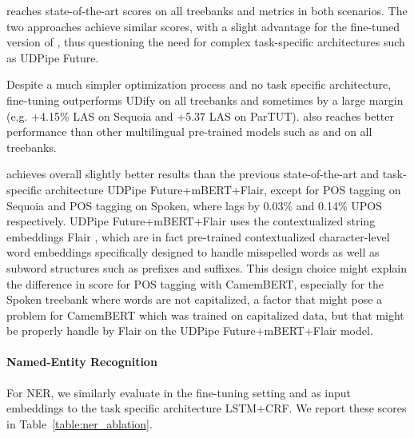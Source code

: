 \camembert reaches state-of-the-art scores on all treebanks and metrics in both scenarios. The two approaches achieve similar scores, with a slight advantage for the fine-tuned version of \camembert, thus questioning the need for complex task-specific architectures such as UDPipe Future.

Despite a much simpler optimization process and no task specific architecture, fine-tuning \camembert outperforms UDify on all treebanks and sometimes by a large margin (e.g. +4.15\% LAS on Sequoia and +5.37 LAS on ParTUT). \camembert also reaches better performance  than other multilingual pre-trained models such as \mbert and \xlmmlmtlm on all treebanks.

\camembert achieves overall slightly better results than the previous state-of-the-art and task-specific architecture UDPipe Future+mBERT+Flair, except for POS tagging on Sequoia and POS tagging on Spoken, where \camembert lags by 0.03\% and 0.14\% UPOS respectively.
UDPipe Future+mBERT+Flair uses the contextualized string embeddings Flair \citep{akbik-etal-2018-contextual}, which are in fact pre-trained contextualized character-level word embeddings specifically designed to handle misspelled words as well as subword structures such as prefixes and suffixes. This design choice might explain the difference in score for POS tagging with CamemBERT, especially for the Spoken treebank where words are not capitalized, a factor that might pose a problem for CamemBERT which was trained on capitalized data, but that might be properly handle by Flair on the UDPipe Future+mBERT+Flair model.

\paragraph{Named-Entity Recognition}
For NER, we similarly evaluate \camembert in the fine-tuning setting and as input embeddings to the task specific architecture LSTM+CRF. We report these scores in Table~\ref{table:ner_ablation}.

